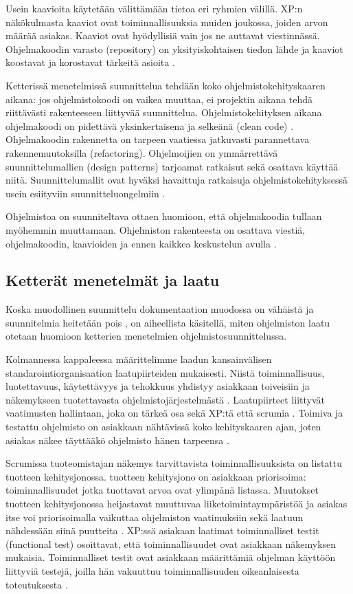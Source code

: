 \documentclass[finnish]{tktltiki2}
\theoremstyle{definition}
\theoremstyle{remark}
\begin{document}
{Usein kaavioita käytetään välittämään tietoa eri ryhmien välillä. XP:n näkökulmasta kaaviot ovat toiminnallisuuksia muiden joukossa, joiden arvon määrää asiakas. Kaaviot ovat hyödyllisiä vain jos ne auttavat viestinnässä. Ohjelmakoodin varasto (repository) on yksityiskohtaisen tiedon lähde ja kaaviot koostavat ja korostavat tärkeitä asioita \cite{FOW01b}.

Ketterissä menetelmissä suunnittelua tehdään koko ohjelmistokehityskaaren aikana: jos ohjelmistokoodi on vaikea muuttaa, ei projektin aikana tehdä riittävästi rakenteeseen liittyvää suunnittelua. Ohjelmistokehityksen aikana ohjelmakoodi on pidettävä yksinkertaisena ja selkeänä (clean code) \cite{FOW01b}.
Ohjelmakoodin rakennetta on tarpeen vaatiessa jatkuvasti parannettava rakennemuutoksilla (refactoring). Ohjelmoijien on ymmärrettävä suunnittelumallien (design patterns) tarjoamat ratkaisut sekä osattava käyttää niitä. Suunnittelumallit ovat hyväksi havaittuja ratkaisuja ohjelmistokehityksessä usein esiityviin suunnitteluongelmiin \cite{FOW01b}.

Ohjelmistoa on suunniteltava ottaen huomioon, että ohjelmakoodia tullaan myöhemmin muuttamaan. Ohjelmiston rakenteesta on osattava viestiä, ohjelmakoodin, kaavioiden ja ennen kaikkea keskustelun avulla \cite{FOW01b}.

\subsection{Ketterät menetelmät ja laatu}

Koska muodollinen suunnittelu dokumentaation muodossa on vähäistä ja suunnitelmia heitetään pois \cite{FOW01b}, on aiheellista käsitellä, miten ohjelmiston laatu otetaan huomioon ketterien menetelmien ohjelmistosuunnittelussa.

Kolmannessa kappaleessa määrittelimme laadun kansainvälisen standarointiorganisaation laatupiirteiden mukaisesti. Niistä toiminnallisuus, luotettavuus, käytettävyys ja tehokkuus yhdistyy asiakkaan toiveisiin ja näkemykseen tuotettavasta ohjelmisto\-järjestelmästä \cite{KIP96}. Laatupiirteet liittyvät vaatimusten hallintaan, joka on tärkeä osa sekä XP:tä \cite{BEC99} että scrumia \cite{SCH09}. Toimiva ja testattu ohjelmisto on asiakkaan nähtävissä koko kehityskaaren ajan, joten asiakas näkee täyttääkö ohjelmisto hänen tarpeensa \cite{BEC99}.

Scrumissa tuoteomistajan näkemys tarvittavista toiminnallisuuksista on listattu tuotteen kehitysjonossa. tuotteen kehitysjono on asiakkaan priorisoima: toiminnallisuudet jotka tuottavat arvoa ovat ylimpänä listassa. Muutokset tuotteen kehitysjonossa heijastavat muuttuvaa liiketoimintaympäristöä ja asiakas itse voi priorisoimalla vaikuttaa ohjelmiston vaatimuksiin sekä laatuun nähdessään siinä puutteita \cite{SCH09}.
XP:ssä asiakaan laatimat toiminnalliset testit (functional test) osoittavat, että toiminnallisuudet ovat asiakkaan näkemyksen mukaisia. Toiminnalliset testit ovat asiakkaan määrittämiä ohjelman käyttöön liittyviä testejä, joilla hän vakuuttuu toiminnallisuuden oikeanlaisesta toteutuksesta \cite{BEC99}.

}
\end{document}
